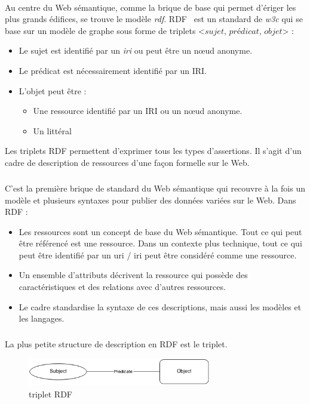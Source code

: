 \paragraph{}
Au centre du Web sémantique, comme la brique de base qui permet d’ériger les plus grands édifices, se trouve le modèle {\itshape\gls{rdf}}. RDF~\cite{RDF_Concepts_W3C:04} est un standard de {\itshape \gls{w3c}} qui se base sur un modèle de graphe sous forme de triplets <$sujet$, $prédicat$, $objet$> : 
\begin{itemize}
\item Le sujet est identifié par un {\itshape \gls{iri}} ou peut être un n\oe{}ud anonyme.
\item Le prédicat est nécessairement identifié par un IRI.
\item L'objet peut être :
\begin{itemize}
\item Une ressource identifié par un IRI ou un n\oe{}ud anonyme.
\item Un littéral
\end{itemize}
\end{itemize}
Les triplets RDF permettent d'exprimer tous les types d'assertions. Il s’agit d’un cadre de description de ressources d’une façon formelle sur le Web. 
\subparagraph{}
C’est la première brique de standard du Web sémantique qui recouvre à la fois un modèle et plusieurs syntaxes pour publier des données variées sur le Web.
Dans RDF :
\begin{itemize}
\item Les ressources sont un concept de base du Web sémantique. Tout ce qui peut être référencé est une ressource. Dans un contexte plus technique, tout ce qui peut être identifié par un \gls{uri} / \gls{iri} peut être considéré comme une ressource.
\item Un ensemble d’attributs décrivent la ressource qui possède des caractéristiques et des relations avec d’autres ressources.
\item Le cadre standardise la syntaxe de ces descriptions, mais aussi les modèles et les langages.
\end{itemize}
\subparagraph{}
La plus petite structure de description en RDF est le triplet.
\begin{figure}[H]
\centering
\includegraphics[width=8cm]{tripletrdf.png}
\caption{triplet RDF}
\end{figure}

